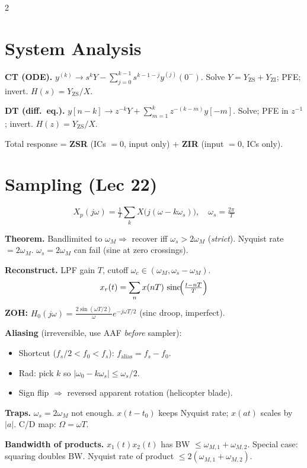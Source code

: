 \documentclass[12pt]{extarticle}
\DeclareMathOperator{\sinc}{sinc}
\begin{document}
\begin{multicols*}{2}
\section*{System Analysis}

\textbf{CT (ODE).} $y^{(k)}\!\to\! s^k Y-\sum_{j=0}^{k-1}\! s^{k-1-j} y^{(j)}(0^-)$. Solve $Y=Y_\text{ZS}+Y_\text{ZI}$; PFE; invert. $H(s)=Y_\text{ZS}/X$.

\textbf{DT (diff.\ eq.).} $y[n-k]\to z^{-k}Y+\sum_{m=1}^k z^{-(k-m)}y[-m]$. Solve; PFE in $z^{-1}$; invert. $H(z)=Y_\text{ZS}/X$.

Total response = \textbf{ZSR} (ICs $=0$, input only) $+$ \textbf{ZIR} (input $=0$, ICs only).

\section*{Sampling (Lec 22)}

\[
X_p(j\omega)=\tfrac{1}{T}\!\sum_k X\!\bigl(j(\omega-k\omega_s)\bigr),\quad \omega_s=\tfrac{2\pi}{T}
\]

\textbf{Theorem.} Bandlimited to $\omega_M \Rightarrow$ recover iff $\omega_s > 2\omega_M$ (\emph{strict}). Nyquist rate $= 2\omega_M$. $\omega_s=2\omega_M$ can fail (sine at zero crossings).

\textbf{Reconstruct.} LPF gain $T$, cutoff $\omega_c \in (\omega_M, \omega_s-\omega_M)$.
\[
x_r(t)=\sum_n x(nT)\,\sinc\!\Bigl(\tfrac{t-nT}{T}\Bigr)
\]
\textbf{ZOH:} $H_0(j\omega) = \tfrac{2\sin(\omega T/2)}{\omega}e^{-j\omega T/2}$ (sinc droop, imperfect).

\textbf{Aliasing} (irreversible, use AAF \emph{before} sampler):
\begin{itemize}
\item Shortcut ($f_s/2 < f_0 < f_s$): $f_\text{alias} = f_s - f_0$.
\item Rad: pick $k$ so $|\omega_0 - k\omega_s| \le \omega_s/2$.
\item Sign flip $\Rightarrow$ reversed apparent rotation (helicopter blade).
\end{itemize}

\textbf{Traps.} $\omega_s = 2\omega_M$ not enough. $x(t-t_0)$ keeps Nyquist rate; $x(at)$ scales by $|a|$. C/D map: $\Omega = \omega T$.

\textbf{Bandwidth of products.} $x_1(t)x_2(t)$ has BW $\le \omega_{M,1}+\omega_{M,2}$. Special case: squaring doubles BW. Nyquist rate of product $\le 2(\omega_{M,1}+\omega_{M,2})$.


\end{multicols*}
\end{document}
